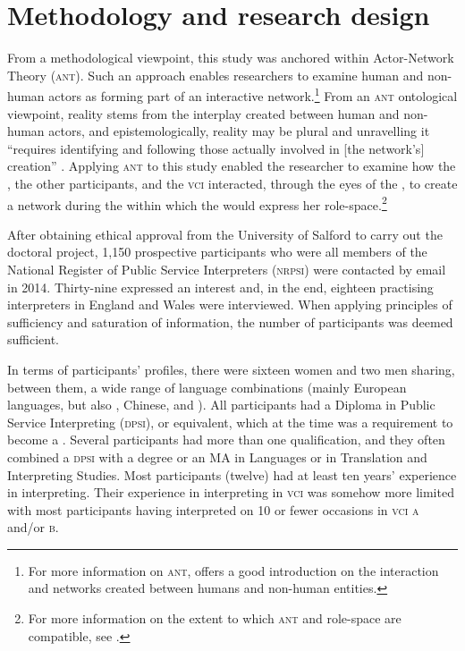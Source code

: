 \documentclass[output=paper]{langsci/langscibook}
\begin{document}
\section{Methodology and research design}
\label{sec:devaux:4}
From a methodological viewpoint, this study was anchored within Actor-Net\-work Theory (\textsc{ant}). Such an approach enables researchers to examine human and non-human actors as forming part of an interactive network.\footnote{For more information on \textsc{ant}, \citet{Latour2005} offers a good introduction on the interaction and networks created between humans and non-human entities.} From an \textsc{ant} ontological viewpoint, reality stems from the interplay created between human and non-human actors, and epistemologically, reality may be plural and unravelling it “requires identifying and following those actually involved in [the network’s] creation” \citep[112]{Bonner2013}. Applying \textsc{ant} to this study enabled the researcher to examine how the , the other  participants, and the \textsc{vci}  interacted, through the eyes of the , to create a network during the  within which the  would express her role-space.\footnote{For more information on the extent to which \textsc{ant} and role-space are compatible, see \citet{Devaux2017b}.} 

After obtaining ethical approval from the University of Salford to carry out the doctoral project, 1,150 prospective participants who were all members of the National Register of Public Service Interpreters (\textsc{nrpsi}) were contacted by email in 2014. Thirty-nine expressed an interest and, in the end, eighteen practising  interpreters in England and Wales were interviewed. When applying  principles of sufficiency and saturation of information, the number of participants was deemed sufficient. 

In terms of participants’ profiles, there were sixteen women and two men sharing, between them, a wide range of language combinations (mainly European languages, but also , Chinese, and ). All participants had a Diploma in Public Service Interpreting (\textsc{dpsi}), or equivalent, which at the time was a requirement to become a . Several participants had more than one qualification, and they often combined a \textsc{dpsi} with a degree or an MA in Languages or in Translation and Interpreting Studies. Most participants (twelve) had at least ten years’ experience in  interpreting. Their experience in interpreting in \textsc{vci} was somehow more limited with most participants having interpreted on 10 or fewer occasions in \textsc{vci a} and/or \textsc{b}.  
\end{document}
